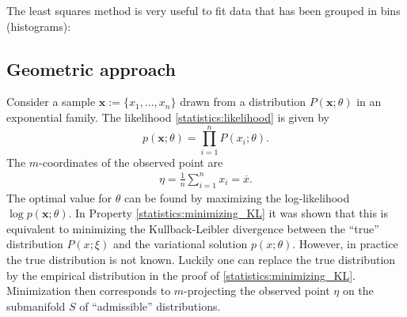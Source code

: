 {    

    The least squares method is very useful to fit data that has been grouped in bins (histograms):

\subsection{Geometric approach}

    Consider a sample $\mathbf{x}:=\{x_1,\ldots,x_n\}$ drawn from a distribution $P(\mathbf{x};\theta)$ in an exponential family. The likelihood \ref{statistics:likelihood} is given by \[p(\mathbf{x};\theta) = \prod_{i=1}^nP(x_i;\theta).\] The $m$-coordinates of the observed point are
    \begin{gather}
        \eta = \frac{1}{n}\sum_{i=1}^nx_i = \overline{x}.
    \end{gather}
    The optimal value for $\theta$ can be found by maximizing the log-likelihood $\log p(\mathbf{x};\theta)$. In Property \ref{statistics:minimizing_KL} it was shown that this is equivalent to minimizing the Kullback-Leibler divergence between the ``true'' distribution $P(x;\xi)$ and the variational solution $p(x;\theta)$. However, in practice the true distribution is not known. Luckily one can replace the true distribution by the empirical distribution in the proof of \ref{statistics:minimizing_KL}. Minimization then corresponds to $m$-projecting the observed point $\eta$ on the submanifold $S$ of ``admissible'' distributions.

}

